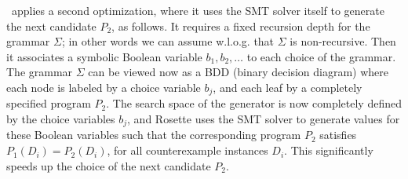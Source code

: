 \cegis\
applies a second optimization, where it uses the SMT solver itself to
generate the next candidate $P_2$, as follows.  It requires a fixed
recursion depth for the grammar $\Sigma$; in other words we can assume
w.l.o.g. that $\Sigma$ is non-recursive.  Then it associates a
symbolic Boolean variable $b_1, b_2, \ldots$ to each choice of the
grammar.  The grammar $\Sigma$ can be viewed now as a BDD (binary
decision diagram) where each node is labeled by a choice variable
$b_j$, and each leaf by a completely specified program $P_2$.  The
search space of the generator is now completely defined by the choice
variables $b_j$, and Rosette uses the SMT solver to generate values
for these Boolean variables such that the corresponding program $P_2$
satisfies $P_1(D_i) = P_2(D_i)$, for all counterexample instances
$D_i$.  This significantly speeds up the choice of the next candidate
$P_2$.





